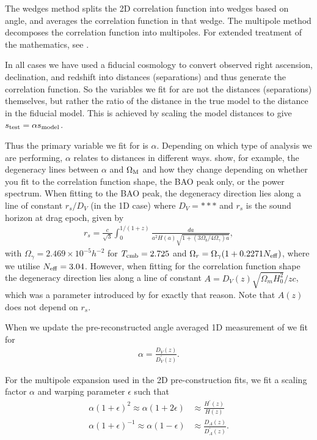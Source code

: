 \documentclass[iop,twocolappendix]{emulateapj}
\begin{document}
The wedges method splits the 2D correlation function into wedges based on angle, and averages the correlation function in that wedge.  The multipole method decomposes the correlation function into multipoles.  For extended treatment of the mathematics, see \citet{KazinSanchezBlanton2012, KazinSanchezCuesta2013, SanchezKazinBeutler2013, XuCuesta2013}. 

In all cases we have used a fiducial cosmology to convert observed right ascension, declination, and redshift into distances (separations) and thus generate the correlation function.  So the variables we fit for are not the distances (separations) themselves, but rather the ratio of the distance in the true model to the distance in the fiducial model.  This is achieved by scaling the model distances to give $s_{\rm test}= \alpha s_{\rm model}$.   

	Thus the primary variable we fit for is $\alpha$.  Depending on which type of analysis we are performing, $\alpha$ relates to  distances in different ways.  \citet{BlakeDavis2011} show, for example, the degeneracy lines between $\alpha$ and $\Omega_{\rm M}$ and how they change depending on whether you fit to the correlation function shape, the BAO peak only, or the power spectrum.  When fitting to the BAO peak, the degeneracy direction lies along a line of constant $r_s/D_V$ (in the 1D case) where $D_V=***$ and  $r_s$ is the sound horizon at drag epoch, given by
	\begin{align}
	r_s = \frac{c}{\sqrt{3}} \int_0^{1/(1+z)} \frac{da}{a^2 H(a) \sqrt{1 + (3\Omega_b/4\Omega_\gamma) a}}, \label{eq:rs}
	\end{align}
	with $\Omega_\gamma = 2.469\times10^{-5} h^{-2}$ for $T_{{\rm cmb}}=2.725$ and $\Omega_r = \Omega_\gamma(1 + 0.2271 N_{{\rm eff}})$, where we utilise $N_{\rm eff} = 3.04$.
	However, when fitting for the correlation function shape the degeneracy direction lies along a line of constant $A=D_V(z) \sqrt{\Omega_m H_0^2} / zc$, which was a parameter introduced by \citet{Eisenstein2005} for exactly that reason.  Note that $A(z)$ does not depend on $r_s$.  


When we update the pre-reconstructed angle averaged 1D measurement of \citet{BlakeKazin2011} we fit for 
\begin{align}
\alpha = \frac{D_V(z)}{D_V^{\prime}(z) }.\label{eq:DvDv}
\end{align}

For the multipole expansion used in the 2D pre-construction fits, we fit a scaling factor $\alpha$ and warping parameter $\epsilon$ such that
\begin{align}
\alpha(1 + \epsilon)^2 \approx \alpha(1 + 2\epsilon) &\approx \frac{H^\prime(z)}{H(z)} \label{eq:alpha1}\\
\alpha(1 + \epsilon)^{-1} \approx \alpha(1 - \epsilon) &\approx \frac{D_A(z)}{D_A^\prime(z) }. \label{eq:alpha2}
\end{align}
\end{document}
